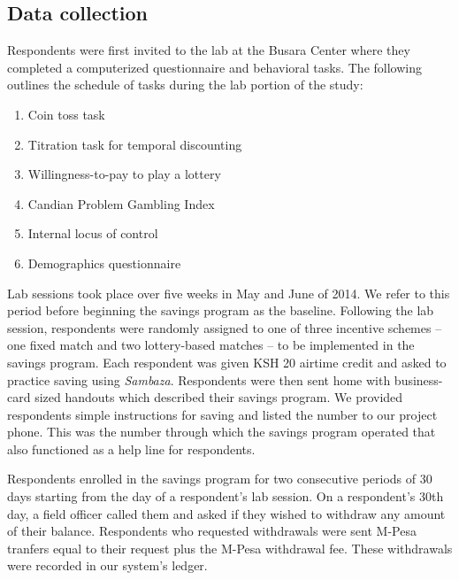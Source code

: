 \documentclass[11pt]{article}
\begin{document}
	\subsection{Data collection}

		Respondents were first invited to the lab at the Busara Center where they completed a computerized questionnaire and behavioral tasks. The following outlines the schedule of tasks during the lab portion of the study:

		\begin{enumerate}
		\item Coin toss task 
		\item Titration task for temporal discounting 
		\item Willingness-to-pay to play a lottery
		\item Candian Problem Gambling Index 
		\item Internal locus of control 
		\item Demographics questionnaire
		\end{enumerate}

		Lab sessions took place over five weeks in May and June of 2014. We refer to this period before beginning the savings program as the baseline. Following the lab session, respondents were randomly assigned to one of three incentive schemes -- one fixed match and two lottery-based matches -- to be implemented in the savings program. Each respondent was given KSH 20 airtime credit and asked to practice saving using \textit{Sambaza}. Respondents were then sent home with business-card sized handouts which described their savings program. We provided respondents simple instructions for saving and listed the number to our project phone. This was the number through which the savings program operated that also functioned as a help line for respondents.

	 	Respondents enrolled in the savings program for two consecutive periods of 30 days starting from the day of a respondent's lab session. On a respondent's 30th day, a field officer called them and asked if they wished to withdraw any amount of their balance. Respondents who requested withdrawals were sent M-Pesa tranfers equal to their request plus the M-Pesa withdrawal fee. These withdrawals were recorded in our system's ledger.
\end{document}
